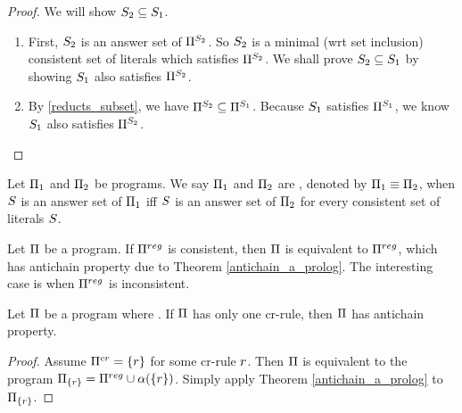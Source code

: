 \documentclass{paper}
\begin{document}
\begin{flushleft}
\begin{proof}
We will show ${S}_{2} \subseteq {S}_{1}$.

\begin{enumerate}
\item
First, ${S}_{2}$ is an answer set of
${\Pi}^{{S}_{2}}$.
So ${S}_{2}$ is a minimal (wrt set inclusion)
consistent set of literals which
satisfies ${\Pi}^{{S}_{2}}$.
We shall prove ${S}_{2} \subseteq {S}_{1}$ by showing
${S}_{1}$ also satisfies ${\Pi}^{{S}_{2}}$.
\item
By \ref{reducts_subset}, we have ${\Pi}^{{S}_{2}}
\subseteq{\Pi}^{{S}_{1}}$.
Because ${S}_{1}$ satisfies ${\Pi}^{{S}_{1}}$,
we know ${S}_{1}$ also satisfies ${\Pi}^{{S}_{2}}$.
\end{enumerate}

\end{proof}

\begin{definition}

Let ${\Pi}_{1}$ and ${\Pi}_{2}$ be \cp{} programs.
We say ${\Pi}_{1}$ and ${\Pi}_{2}$ are ,
denoted by ${\Pi}_{1} \equiv {\Pi}_{2}$, when
$S$ is an answer set of ${\Pi}_{1}$ iff $S$ is an
answer set of ${\Pi}_{2}$ for every consistent set of literals
$S$.
\end{definition}

\begin{remark}
\label{consistent_p_reg}

Let $\Pi$ be a \cp{} program.
If $\Pi^{reg}$ is consistent, then $\Pi$ is equivalent to
$\Pi^{reg}$, which has antichain property due to Theorem
\ref{antichain_a_prolog}.
The interesting case is when $\Pi^{reg}$ is inconsistent.

\end{remark}

\begin{corollary}
\label{one_cr_rule}

Let $\Pi$ be a \cp{} program where \inconspreg{}.
If $\Pi$ has only one cr-rule, then $\Pi$ has
antichain property.

\end{corollary}

\begin{proof}

Assume $\Pi^{cr} = \{r\}$ for some cr-rule $r$.
Then $\Pi$ is equivalent to the \ap{} program
$\Pi_{\{r\}} = \Pi^{reg} \cup \alpha(\{r\})$.
Simply apply Theorem \ref{antichain_a_prolog} to
$\Pi_{\{r\}}$.

\end{proof}


\end{flushleft}
\end{document}

